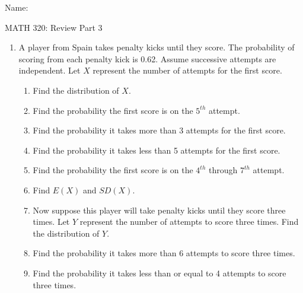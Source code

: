 \documentclass{article}
\begin{document}
\hspace{375pt}Name:

\begin{center}
{\Huge MATH 320: Review Part 3}

\end{center}


\bigskip\bigskip

\begin{enumerate}
    \item A player from Spain takes penalty kicks until they score. The probability of scoring from each penalty kick is 0.62. Assume successive attempts are independent. Let $X$ represent the number of attempts for the first score.\bigskip
    \begin{enumerate}
        \item Find the distribution of $X$.\vspace{50pt}
        \item Find the probability the first score is on the $5^{th}$ attempt.\vspace{50pt}
        \item Find the probability it takes more than 3 attempts for the first score.\vspace{50pt}
        \item Find the probability it takes less than 5 attempts for the first score.\vspace{50pt}
        \item Find the probability the first score is on the $4^{th}$ through $7^{th}$ attempt.\vspace{50pt}
        \item Find $E(X)$ and $SD(X)$.\vspace{50pt}
        \item Now suppose this player will take penalty kicks until they score three times. Let $Y$ represent the number of attempts to score three times. Find the distribution of $Y$.\vspace{50pt}
        \item Find the probability it takes more than 6 attempts to score three times.\vspace{50pt}
        \item Find the probability it takes less than or equal to 4 attempts to score three times.\vspace{50pt}
    \end{enumerate}\bigskip
        

\end{enumerate}
\end{document}
